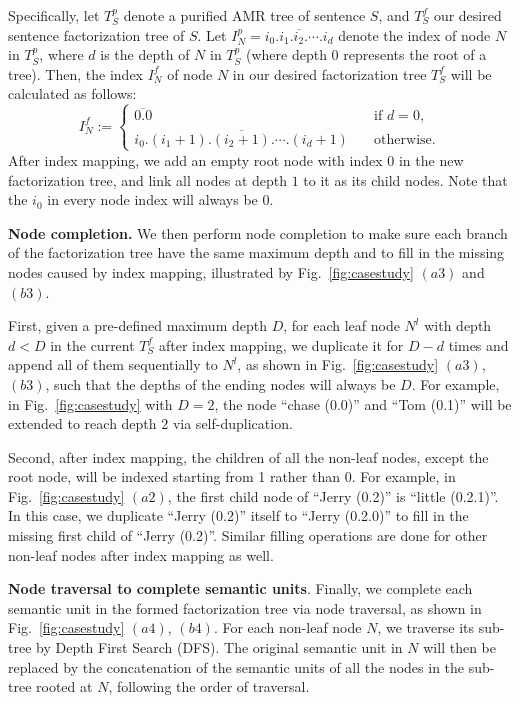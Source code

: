 Specifically, let $T^p_S$ denote a purified AMR tree of sentence $S$, and $T^f_S$ our desired sentence factorization tree of $S$.
Let $I^p_N = \overline{i_0.i_1.i_2.\cdots.i_d}$ denote the index of node $N$ in $T^p_S$, where $d$ is the depth of $N$ in $T^p_S$ (where depth 0 represents the root of a tree).
Then, the index $I^f_N$ of node $N$ in our desired factorization tree $T^f_S$ will be calculated as follows:
\begin{equation}
\label{eqn:transform-index}
I^f_N := \begin{cases}
 		     \overline{0.0} & \quad \text{if } d=0, \\ 
 			 \overline{i_0.(i_1+1).(i_2+1).\cdots.(i_d + 1)} & \quad \text{otherwise}. 
		 \end{cases}
\end{equation}
After index mapping, we add an empty root node with index $0$ in the new factorization tree, and link all nodes at depth $1$ to it as its child nodes. Note that the $i_0$ in every node index will always be 0.


\textbf{Node completion.}
We then perform node completion to make sure each branch of the factorization tree have the same maximum depth and to fill in the missing nodes caused by index mapping, illustrated by Fig.~\ref{fig:casestudy} $(a3)$ and $(b3)$.

First, given a pre-defined maximum depth $D$, for each leaf node $N^l$ with depth $d < D$ in the current $T^f_S$ after index mapping, we duplicate it for $D - d$ times and append all of them sequentially to $N^l$, as shown in Fig.~\ref{fig:casestudy} $(a3)$, $(b3)$, such that the depths of the ending nodes will always be $D$. For example, in Fig.~\ref{fig:casestudy} with $D = 2$, the node ``chase (0.0)'' and ``Tom (0.1)'' will be extended to reach depth $2$ via self-duplication.

Second, after index mapping, the children of all the non-leaf nodes, except the root node, will be indexed starting from 1 rather than 0. For example, in Fig.~\ref{fig:casestudy} $(a2)$, the first child node of ``Jerry (0.2)'' is ``little (0.2.1)''. %
In this case, we duplicate ``Jerry (0.2)'' itself to ``Jerry (0.2.0)'' to fill in the missing first child of ``Jerry (0.2)''. Similar filling operations are done for other non-leaf nodes after index mapping as well.

\textbf{Node traversal to complete semantic units}.
Finally, we complete each semantic unit in the formed factorization tree via node traversal, as shown in Fig.~\ref{fig:casestudy} $(a4)$, $(b4)$.
For each non-leaf node $N$, we traverse its sub-tree by Depth First Search (DFS). The original semantic unit in $N$ will then be replaced by the concatenation of the semantic units of all the nodes in the sub-tree rooted at $N$, following the order of traversal.

